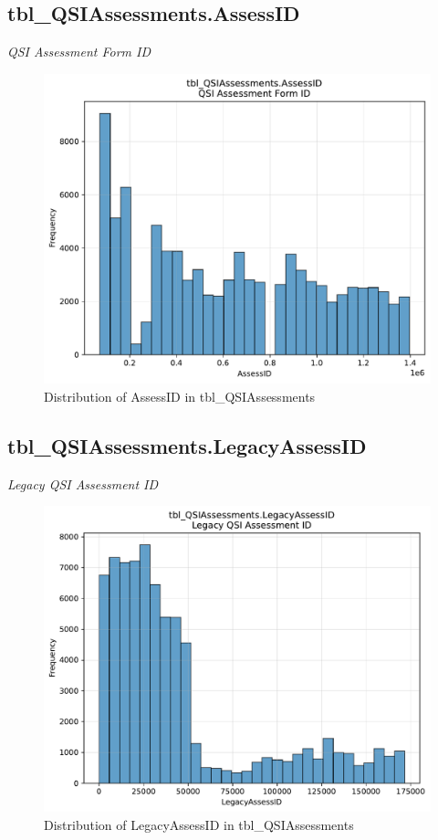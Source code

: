\subsection{tbl\_QSIAssessments.AssessID}
\textit{QSI Assessment Form ID}

\begin{figure}[htbp]
\centering
\includegraphics[width=\textwidth]{figures/dbo_tbl_QSIAssessments_AssessID.pdf}
\caption{Distribution of AssessID in tbl\_QSIAssessments}
\end{figure}\newpage

\subsection{tbl\_QSIAssessments.LegacyAssessID}
\textit{Legacy QSI Assessment ID}

\begin{figure}[htbp]
\centering
\includegraphics[width=\textwidth]{figures/dbo_tbl_QSIAssessments_LegacyAssessID.pdf}
\caption{Distribution of LegacyAssessID in tbl\_QSIAssessments}
\end{figure}\newpage

